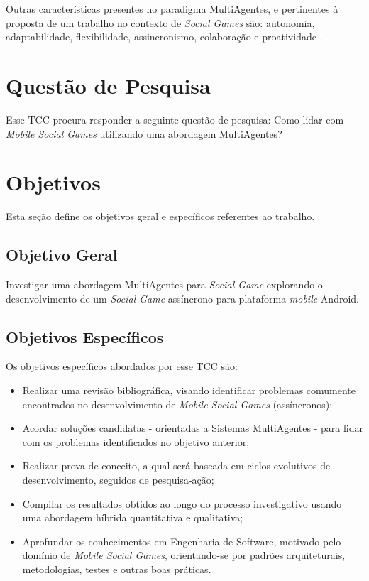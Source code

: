 Outras características presentes no paradigma
MultiAgentes, e pertinentes à proposta de um trabalho no contexto de
\textit{Social Games} são: autonomia, adaptabilidade, flexibilidade,
assincronismo, colaboração e proatividade \cite{bergenti2015}.


\section{Questão de Pesquisa}

Esse TCC procura responder a seguinte questão de pesquisa: Como lidar com \textit{Mobile Social Games} utilizando uma abordagem MultiAgentes?


\section{Objetivos}

Esta seção define os objetivos geral e específicos referentes ao trabalho.

    \subsection{Objetivo Geral}

        Investigar uma abordagem MultiAgentes para \textit{Social Game} explorando o desenvolvimento de um \textit{Social Game} assíncrono para plataforma \textit{mobile} Android.

    \subsection{Objetivos Específicos}

        Os objetivos específicos abordados por esse TCC são:

        \begin{itemize}
          \item Realizar uma revisão bibliográfica, visando identificar problemas comumente encontrados no desenvolvimento de \textit{Mobile Social Games} (assíncronos);
          \item Acordar soluções candidatas - orientadas a Sistemas MultiAgentes - para lidar com os problemas identificados no objetivo anterior;
          \item Realizar prova de conceito, a qual será baseada em ciclos evolutivos de desenvolvimento, seguidos de pesquisa-ação;
          \item Compilar os resultados obtidos ao longo do processo investigativo usando uma abordagem híbrida quantitativa e qualitativa;
          \item Aprofundar os conhecimentos em Engenharia de Software, motivado pelo domínio de \textit{Mobile Social Games}, orientando-se por padrões arquiteturais, metodologias, testes e outras boas práticas.
        \end{itemize}

